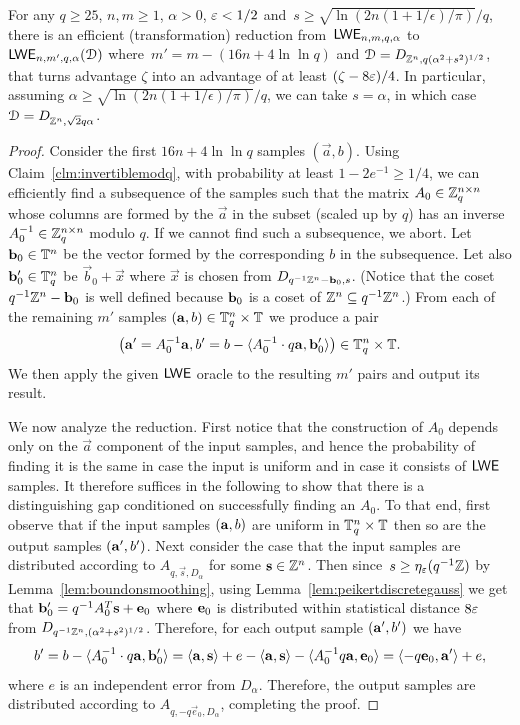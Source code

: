 \begin{lemma}\label{lem:normalform}
  For any $q \ge 25$, $n,m \geq 1$, $\alpha>0$, $\varepsilon < 1/2$ and~$s \geq
  \sqrt{\ln(2n(1+1/\epsilon)/\pi)}/q$, there is an efficient
  (transformation) reduction from~$\mathsf{LWE}_{n,m,q,\alpha}$ to
  $\mathsf{LWE}_{n,m',q,\alpha}(\mathcal{D})$
  where~$m' = m - (16n + 4\ln \ln q)$ and $\mathcal{D}=D_{\mathbb{Z}^n,q(\alpha^2+s^2)^{1/2}}$, that 
	turns advantage $\zeta$ into an advantage of at least $(\zeta-8\varepsilon)/4$.
	In particular, assuming $\alpha \geq \sqrt{\ln(2n(1+1/\epsilon)/\pi)}/q$, we can take $s=\alpha$,
	in which case $\mathcal{D}=D_{\mathbb{Z}^n,\sqrt{2}q\alpha}$.
\end{lemma}

\begin{proof}
  Consider the first $16n + 4\ln\ln q$ samples $(\vec{a},b)$.
	Using Claim~\ref{clm:invertiblemodq}, with probability at least
	$1-2e^{-1} \ge 1/4$, we can efficiently find a subsequence of the samples
	such that the matrix $A_0 \in \mathbb{Z}_q^{n \times n}$ whose columns
	are formed by the $\vec{a}$ in the subset (scaled up by $q$)
	has an inverse $A_0^{-1} \in \mathbb{Z}_q^{n \times n}$ modulo $q$. If we cannot find such a subsequence, we abort. 
	Let $\mathbf{b}_0 \in \mathbb{T}^n$ be the vector formed by the corresponding $b$ in the subsequence.
	Let also $\mathbf{b}'_0 \in \mathbb{T}_q^n$ be $\vec{b}_0 + \vec{x}$ where $\vec{x}$ is
	chosen from $D_{q^{-1}\mathbb{Z}^n - \mathbf{b}_0,s}$. 
	(Notice that the coset $q^{-1}\mathbb{Z}^n - \mathbf{b}_0$ is well defined
because $\mathbf{b}_0$ is a coset of $\mathbb{Z}^{n} \subseteq q^{-1}\mathbb{Z}^n$.)
  From each of the remaining $m'$ samples $(\mathbf{a},b) \in \mathbb{T}_q^n \times \mathbb{T}$ we produce a pair
	\[
	  \big(\mathbf{a}' = A_0^{-1} \mathbf{a}, b' = b - \langle A_0^{-1} \cdot q \mathbf{a}, \mathbf{b}'_0\rangle\big) \in \mathbb{T}_q^n \times \mathbb{T}.
	\]
	We then apply the given $\mathsf{LWE}$ oracle to the resulting $m'$ pairs and output its result. 
		
	We now analyze the reduction. First notice that the construction of $A_0$ depends
	only on the $\vec{a}$ component of the input samples, and hence the probability of 
	finding it is the same in case the input is uniform and in case it consists of $\mathsf{LWE}$ samples.
	It therefore suffices in the following to show that there is a distinguishing gap conditioned
	on successfully finding an $A_0$. 
	To that end, first observe that if the input samples $(\mathbf{a},b)$ are uniform in $\mathbb{T}_q^n \times \mathbb{T}$
	then so are the output samples $(\mathbf{a}',b')$.
	Next consider the case that the input samples are distributed according to $A_{q,\vec{s},D_{\alpha}}$
	for some $\mathbf{s} \in \mathbb{Z}^n$. Then since~$s \geq \eta_{\varepsilon}(q^{-1}\mathbb{Z})$ by Lemma~\ref{lem:boundonsmoothing},
	using Lemma~\ref{lem:peikertdiscretegauss} we get that $\mathbf{b}_0' = q^{-1} A_0^T \mathbf{s} + \mathbf{e}_0$
	where $\mathbf{e}_0$ is distributed within statistical distance $8\varepsilon$ from $D_{q^{-1}\mathbb{Z}^n, (\alpha^2+s^2)^{1/2}}$.
	Therefore, for each output sample $(\mathbf{a}',b')$ we have
	\[
	   b' = b - \langle A_0^{-1} \cdot q \mathbf{a}, \mathbf{b}'_0\rangle 
		    = \langle\mathbf{a},\mathbf{s}\rangle+ e - \langle\mathbf{a}, \mathbf{s}\rangle - \langle A_0^{-1} q \mathbf{a}, \mathbf{e}_0\rangle
				= \langle-q \mathbf{e}_0, \mathbf{a}'\rangle+e,
	\]
	where $e$ is an independent error from $D_\alpha$. Therefore, the output samples
	are distributed according to $A_{q,-q\vec{e}_0,D_{\alpha}}$, completing the proof.
\end{proof}


